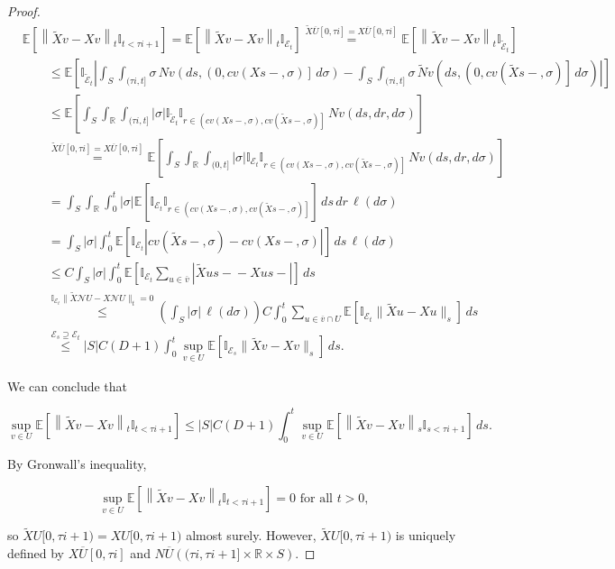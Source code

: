 \documentclass[12pt]{article}
\newcommand{\mb}{\mathbb}
\newcommand{\mc}{\mathcal}
\newcommand{\ov}{\overline}
\newcommand{\os}{\overset}
\newcommand{\te}{\text}
\newcommand{\ind}{\hspace{24pt}}
\newcommand{\ex}[1]{\mb{E}\left[#1\right]}			%
\renewcommand{\v}{v}							%
\newcommand{\vv}{u}								%
\renewcommand{\U}{U}							%
\renewcommand{\S}{S}							%
\newcommand{\s}{\sigma}							%
\renewcommand{\t}{t}							%
\renewcommand{\tt}{s}							%
\newcommand{\X}{X}								%
\newcommand{\IGr}{c}							%
\newcommand{\neigh}{\mc{N}}						%
\newcommand{\cl}{\ov}							%
\newcommand{\const}{C}							%
\newcommand{\degr}{D}							%
\newcommand{\poiss}{N}							%
\newcommand{\Sm}{\ell}							%
\renewcommand{\r}{r}							%
\newcommand{\alt}[1]{\widetilde{#1}}			%
\newcommand{\rt}{\tau}							%
\newcommand{\evnt}{\mc{E}}						%
\begin{document}
\begin{proof}
\begin{align*}
&\ex{\left\|\alt{\X}{{\v}{}} - \X{\v}{}\right\|_{\t}\mb{I}_{\t < \rt{i+1}}} = \ex{\left\|\alt{\X}{{\v}{}} - \X{\v}{}\right\|_{\t}\mb{I}_{\evnt_\t}}\os{\alt{\X}{{\cl{\U}}{}}[0,\rt{i}] = \X{\cl{\U}}{[0,\rt{i}]}}{=} \ex{\left\|\alt{\X}{{\v}{}} - \X{\v}{}\right\|_{\t}\mb{I}_{\alt{\evnt}_\t}}\\
&\ind\leq \ex{\mb{I}_{\alt{\evnt}_\t}\left|\int_\S\int_{(\rt{i},t]} \s\,\poiss{\v}\left(d\tt,\left(0,\IGr{\v}(\X{}{\tt-},\s)\right]\,d\s\right) - \int_\S\int_{(\rt{i},\t]} \s\,\alt{\poiss}{\v}\left(d\tt,\left(0,\IGr{\v}(\alt{\X}{{}{\tt-}},\s)\right]\,d\s\right)\right|}\\
&\ind \leq \ex{\int_\S\int_{\mb{R}}\int_{(\rt{i},\t]}|\s|\mb{I}_{\alt{\evnt}_\t}\mb{I}_{\r\in \left(\IGr{\v}(\X{}{\tt-},\s), \IGr{\v}(\alt{\X}{{}{\tt-}},\s)\right]}\,\poiss{\v}\left(d\tt,d\r,d\s\right)}\\
&\ind \os{\alt{\X}{{\cl{\U}}{}}[0,\rt{i}] = \X{\cl{\U}}{[0,\rt{i}]}}{=} \ex{\int_\S\int_{\mb{R}}\int_{(0,\t]}|\s|\mb{I}_{\evnt_\t}\mb{I}_{\r\in \left(\IGr{\v}(\X{}{\tt-},\s), \IGr{\v}(\alt{\X}{{}{\tt-}},\s)\right]}\,\poiss{\v}\left(d\tt,d\r,d\s\right)}\\
&\ind = \int_\S\int_\mb{R}\int_0^\t |\s|\ex{\mb{I}_{\evnt_\t}\mb{I}_{\r\in\left(\IGr{\v}(\X{}{\tt-},\s),\IGr{\v}(\alt{\X}{{}{\tt-}},\s)\right]}}\,d\tt\,d\r\,\Sm(d\s)\\
&\ind = \int_\S |\s|\int_0^\t \ex{\mb{I}_{\evnt_t}\left|\IGr{\v}(\alt{\X}{{}{\tt-}},\s) - \IGr{\v}(\X{}{\tt-},\s)\right|}\,d\tt\,\Sm(d\s)\\
&\ind \leq \const{}\int_\S|\s|\int_0^\t\ex{\mb{I}_{\evnt_t}\sum_{\vv\in \cl{\v}}\left|\alt{\X}{{\vv}{\tt-}} - \X{\vv}{\tt-}\right|}\,d\tt\\
&\ind \os{\mb{I}_{\evnt_\t}\|\alt{\X}{{\neigh{\U}}{}} - \X{\neigh{\U}}{}\|_t = 0}{\leq} \left(\int_\S|\s|\,\Sm(d\s)\right)\const{} \int_0^\t \sum_{\vv\in \cl{\v}\cap\U}\ex{\mb{I}_{\evnt_t}\|\alt{\X}{{\vv}{}} - \X{\vv}{}\|_\tt}\,d\tt\\
&\ind \os{\evnt_\tt \supseteq \evnt_\t}{\leq} |S|\const{}(\degr+1) \int_0^\t \sup_{\v\in \U}\ex{\mb{I}_{\evnt_\tt}\|\alt{\X}{{\v}{}} - \X{\v}{}\|_\tt}\,d\tt.
\end{align*}

We can conclude that

\[\sup_{\v\in \U}\ex{\left\|\alt{\X}{{\v}{}} - \X{\v}{}\right\|_{\t}\mb{I}_{t <\rt{i+1}}} \leq |\S|\const{}(\degr+1)\int_0^\t\sup_{v\in\U}\ex{\left\|\alt{\X}{{\v}{}} - \X{\v}{}\right\|_\tt\mb{I}_{\tt < \rt{i+1}}}\,d\tt.\]

By Gronwall's inequality,

\[\sup_{v\in \U}\ex{\left\|\alt{\X}{{\v}{}} - \X{\v}{}\right\|_\t\mb{I}_{\t < \rt{i+1}}} = 0 \te{ for all } \t > 0,\]

so \(\alt{\X}{{\U}{}}[0,\rt{i+1}) = \X{\U}{[0,\rt{i+1})}\) almost surely. However, \(\alt{\X}{{\U}{}}[0,\rt{i+1})\) is uniquely defined by \(\X{\cl{\U}}{[0,\rt{i}]}\) and \(\poiss{\cl{\U}}\left((\rt{i},\rt{i+1}]\times \mb{R}\times \S\right)\).
\end{proof}
\end{document}

